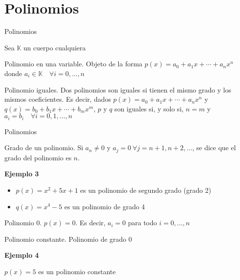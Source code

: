 \documentclass[
  ignorenonframetext,
]{beamer}
\providecommand{\tightlist}{%
  \setlength{\itemsep}{0pt}\setlength{\parskip}{0pt}}
\begin{document}
\hypertarget{polinomios}{%
\section{Polinomios}\label{polinomios}}

\begin{frame}{Polinomios}
\protect\hypertarget{polinomios-1}{}

Sea \(\mathbb{K}\) un cuerpo cualquiera

Polinomio en una variable. Objeto de la forma
\(p(x)=a_0+a_1x+\cdots+a_nx^n\) donde
\(a_i\in\mathbb{K}\quad \forall i=0,\dots,n\)

Polinomio iguales. Dos polinomios son iguales si tienen el mismo grado y
los mismos coeficientes. Es decir, dados
\(p(x) = a_0+a_1x+\cdots+a_nx^n\) y \(q(x) = b_0+b_1x+\cdots+b_mx^m\),
\(p\) y \(q\) son iguales si, y solo si, \(n = m\) y
\(a_i=b_i\quad \forall i=0,1,\dots,n\)

\end{frame}

\begin{frame}{Polinomios}
\protect\hypertarget{polinomios-2}{}

Grado de un polinomio. Si \(a_n\ne 0\) y
\(a_j = 0\ \forall j=n+1,n+2,\dots\), se dice que el grado del polinomio
es \(n\).

\textbf{Ejemplo 3}

\begin{itemize}
\tightlist
\item
  \(p(x)=x^2+5x+1\) es un polinomio de segundo grado (grado 2)
\item
  \(q(x)=x^4-5\) es un polinomio de grado 4
\end{itemize}

Polinomio 0. \(p(x)=0\). Es decir, \(a_i=0\) para todo \(i=0,\dots,n\)

Polinomio constante. Polinomio de grado 0

\textbf{Ejemplo 4}

\(p(x)=5\) es un polinomio constante

\end{frame}
\end{document}
